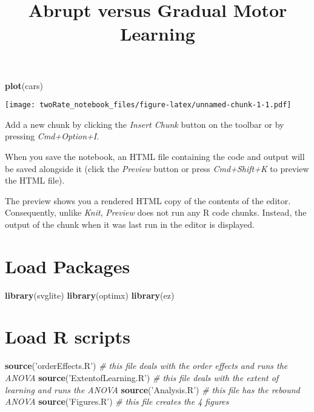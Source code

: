 \documentclass[]{article}
\title{Abrupt versus Gradual Motor Learning}
\author{}
\date{}
\newenvironment{Shaded}{\begin{snugshade}}{\end{snugshade}}
\newcommand{\KeywordTok}[1]{\textcolor[rgb]{0.13,0.29,0.53}{\textbf{#1}}}
\newcommand{\StringTok}[1]{\textcolor[rgb]{0.31,0.60,0.02}{#1}}
\newcommand{\CommentTok}[1]{\textcolor[rgb]{0.56,0.35,0.01}{\textit{#1}}}
\newcommand{\NormalTok}[1]{#1}
\begin{document}
\maketitle

\begin{Shaded}
\begin{Highlighting}[]
\KeywordTok{plot}\NormalTok{(cars)}
\end{Highlighting}
\end{Shaded}

\texttt{[image: twoRate\_notebook\_files/figure-latex/unnamed-chunk-1-1.pdf]}

Add a new chunk by clicking the \emph{Insert Chunk} button on the
toolbar or by pressing \emph{Cmd+Option+I}.

When you save the notebook, an HTML file containing the code and output
will be saved alongside it (click the \emph{Preview} button or press
\emph{Cmd+Shift+K} to preview the HTML file).

The preview shows you a rendered HTML copy of the contents of the
editor. Consequently, unlike \emph{Knit}, \emph{Preview} does not run
any R code chunks. Instead, the output of the chunk when it was last run
in the editor is displayed.

\section{Load Packages}\label{load-packages}

\begin{Shaded}
\begin{Highlighting}[]
\KeywordTok{library}\NormalTok{(svglite)}
\KeywordTok{library}\NormalTok{(optimx)}
\KeywordTok{library}\NormalTok{(ez)}
\end{Highlighting}
\end{Shaded}

\section{Load R scripts}\label{load-r-scripts}

\begin{Shaded}
\begin{Highlighting}[]
\KeywordTok{source}\NormalTok{(}\StringTok{'orderEffects.R'}\NormalTok{) }\CommentTok{# this file deals with the order effects and runs the ANOVA}
\KeywordTok{source}\NormalTok{(}\StringTok{'ExtentofLearning.R'}\NormalTok{) }\CommentTok{# this file deals with the extent of learning and runs the ANOVA}
\KeywordTok{source}\NormalTok{(}\StringTok{'Analysis.R'}\NormalTok{) }\CommentTok{# this file has the rebound ANOVA}
\KeywordTok{source}\NormalTok{(}\StringTok{'Figures.R'}\NormalTok{) }\CommentTok{# this file creates the 4 figures}
\end{Highlighting}
\end{Shaded}
\end{document}
